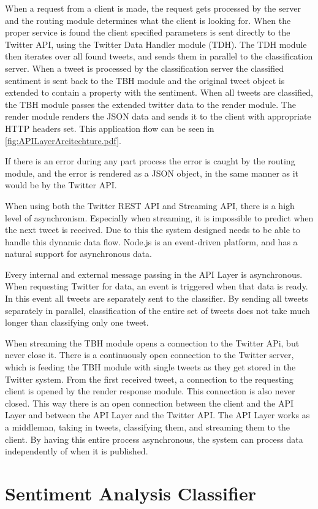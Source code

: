 When a request from a client is made, the request gets processed by the server and the routing module determines what the client is looking for. When the proper service is found the client specified parameters is sent directly to the Twitter API, using the Twitter Data Handler module (TDH). The TDH module then iterates over all found tweets, and sends them in parallel to the classification server. When a tweet is processed by the classification server the classified sentiment is sent back to the TBH module and the original tweet object is extended to contain a property with the sentiment. When all tweets are classified, the TBH module passes the extended twitter data to the render module. The render module renders the JSON data and sends it to the client with appropriate HTTP headers set. This application flow can be seen in \autoref{fig:APILayerArcitechture.pdf}.

If there is an error during any part process the error is caught by the routing module, and the error is rendered as a JSON object, in the same manner as it would be by the Twitter API. 



When using both the Twitter REST API and Streaming API, there is a high level of asynchronism. Especially when streaming, it is impossible to predict when the next tweet is received. Due to this the system designed needs to be able to handle this dynamic data flow. Node.js is an event-driven platform, and has a natural support for asynchronous data. 

Every internal and external message passing in the API Layer is asynchronous. When requesting Twitter for data, an event is triggered when that data is ready. In this event all tweets are separately sent to the classifier. By sending all tweets separately in parallel, classification of the entire set of tweets does not take much longer than classifying only one tweet. 

When streaming the TBH module opens a connection to the Twitter APi, but never close it. There is a continuously open connection to the Twitter server, which is feeding the TBH module with single tweets as they get stored in the Twitter system. From the first received tweet, a connection to the requesting client is opened by the render response module. This connection is also never closed. This way there is an open connection between the client and the API Layer and between the API Layer and the Twitter API. The API Layer works as a middleman, taking in tweets, classifying them, and streaming them to the client. By having this entire process asynchronous, the system can process data independently of when it is published.


\section{Sentiment Analysis Classifier}

